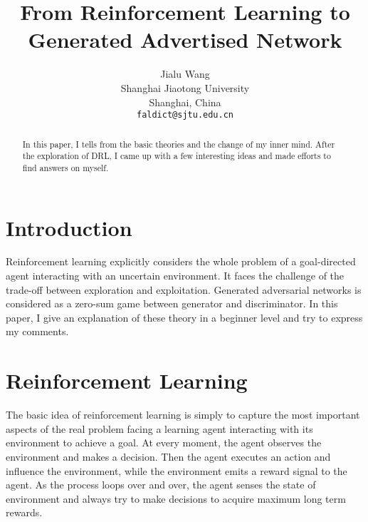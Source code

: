\documentclass[10pt,twocolumn,letterpaper]{article}
\begin{document}
\title{From Reinforcement Learning to Generated Advertised Network}

\author{Jialu Wang\\
Shanghai Jiaotong University\\
Shanghai, China\\
{\tt\small faldict@sjtu.edu.cn}
}

\maketitle

\begin{abstract}
	In this paper, I tells from the basic theories and the change of my inner mind.
	After the exploration of DRL, I came up with a few interesting ideas and made
	efforts to find answers on myself.
\end{abstract}

\section{Introduction}

Reinforcement learning explicitly considers the whole problem of a goal-directed agent interacting
with an uncertain environment. It faces the challenge of the trade-off between exploration and exploitation\cite{ref0}.
Generated adversarial networks is considered as a zero-sum game between generator and discriminator.  
In this paper, I give an explanation of these theory in a beginner level and try to express my comments.

\section{Reinforcement Learning}

The basic idea of reinforcement learning is simply to capture the most important aspects of the real problem
facing a learning agent interacting with its environment to achieve a goal. At every moment, the agent observes the 
environment and makes a decision. Then the agent executes an action and influence the environment, while the
environment emits a reward signal to the agent.  As the process loops over and over, the agent senses the state of environment and always try to
make decisions to acquire maximum long term rewards.
\end{document}
